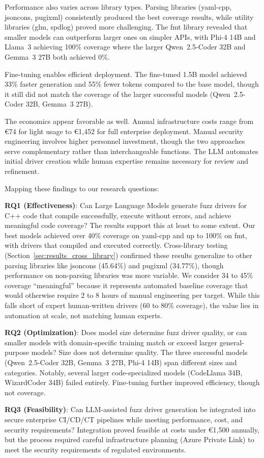 Performance also varies across library types. Parsing libraries (yaml-cpp, jsoncons, pugixml) consistently produced the best coverage results, while utility libraries (glm, spdlog) proved more challenging. The fmt library revealed that smaller models can outperform larger ones on simpler APIs, with Phi-4 14B and Llama~3 achieving 100\% coverage where the larger Qwen~2.5-Coder 32B and Gemma~3 27B both achieved 0\%.

Fine-tuning enables efficient deployment. The fine-tuned 1.5B model achieved 33\% faster generation and 55\% fewer tokens compared to the base model, though it still did not match the coverage of the larger successful models (Qwen~2.5-Coder 32B, Gemma~3 27B).

The economics appear favorable as well. Annual infrastructure costs range from \euro{}74 for light usage to \euro{}1,452 for full enterprise deployment. Manual security engineering involves higher personnel investment, though the two approaches serve complementary rather than interchangeable functions. The LLM automates initial driver creation while human expertise remains necessary for review and refinement.

Mapping these findings to our research questions:

\textbf{RQ1 (Effectiveness)}: Can Large Language Models generate fuzz drivers for C++ code that compile successfully, execute without errors, and achieve meaningful code coverage? The results support this at least to some extent. Our best models achieved over 40\% coverage on yaml-cpp and up to 100\% on fmt, with drivers that compiled and executed correctly. Cross-library testing (Section~\ref{sec:results_cross_library}) confirmed these results generalize to other parsing libraries like jsoncons (45.64\%) and pugixml (34.77\%), though performance on non-parsing libraries was more variable. We consider 34 to 45\% coverage ``meaningful'' because it represents automated baseline coverage that would otherwise require 2 to 8 hours of manual engineering per target. While this falls short of expert human-written drivers (60 to 80\% coverage), the value lies in automation at scale, not matching human experts.

\textbf{RQ2 (Optimization)}: Does model size determine fuzz driver quality, or can smaller models with domain-specific training match or exceed larger general-purpose models? Size does not determine quality. The three successful models (Qwen~2.5-Coder 32B, Gemma~3 27B, Phi-4 14B) span different sizes and categories. Notably, several larger code-specialized models (CodeLlama 34B, WizardCoder 34B) failed entirely. Fine-tuning further improved efficiency, though not coverage.

\textbf{RQ3 (Feasibility)}: Can LLM-assisted fuzz driver generation be integrated into secure enterprise CI/CD/CT pipelines while meeting performance, cost, and security requirements? Integration proved feasible at costs under \euro{}1,500 annually, but the process required careful infrastructure planning (Azure Private Link) to meet the security requirements of regulated environments.